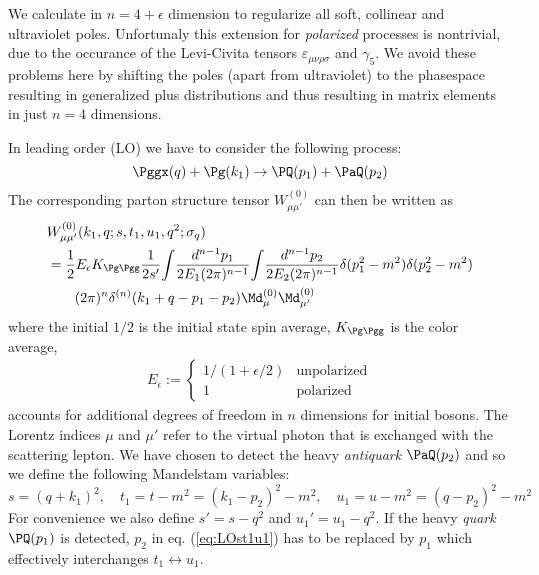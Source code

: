 We calculate in $n=4+\epsilon$ dimension to regularize all soft, collinear and ultraviolet poles. Unfortunaly this extension for \textit{polarized} processes is nontrivial, due to the occurance of the Levi-Civita tensors $\varepsilon_{\mu\nu\rho\sigma}$ and $\gamma_5$. We avoid these problems here by shifting the poles (apart from ultraviolet) to the phasespace resulting in generalized plus distributions and thus resulting in matrix elements in just $n=4$ dimensions.

In leading order (LO) we have to consider the following process:
\begin{equation}
\Pggx(q) + \Pg(k_1) \rightarrow \PQ(p_1)+\PaQ(p_2)
\end{equation}
The corresponding parton structure tensor $W_{\mu\mu'}^{(0)}$ can then be written as
\begin{align}
&W_{\mu\mu'}^{(0)}(k_1,q;s,t_1,u_1,q^2;\sigma_{q})\nonumber\\
 &= \frac 1 2 E_\epsilon K_{\Pg\Pgg}\frac{1}{2s'}\!\int\!\frac{d^{n-1}p_1}{2E_1(2\pi)^{n-1}}\!\int\!\frac{d^{n-1}p_2}{2E_2(2\pi)^{n-1}}\delta(p_1^2-m^2) \delta(p_2^2-m^2)\nonumber\\
 &\hspace{20pt}(2\pi)^n\delta^{(n)}(k_1+q-p_1-p_2) \Md_{\mu}^{(0)}\Md_{\mu'}^{(0)}
\label{eq:PartonicStructureTensor0}\end{align}
where the initial $1/2$ is the initial state spin average, $K_{\Pg\Pgg}$ is the color average,
\begin{align}
E_\epsilon := \left\{\begin{array}{ll}
1/(1+\epsilon/2) &\text{unpolarized}\\
1 &\text{polarized}
\end{array}\right.
\end{align}
accounts for additional degrees of freedom in $n$ dimensions for initial bosons. The Lorentz indices $\mu$ and $\mu'$ refer to the virtual photon that is exchanged with the scattering lepton. We have chosen to detect the heavy \textit{antiquark} $\PaQ(p_2)$ and so we define the following Mandelstam variables:
\begin{equation}
s = (q+k_1)^2, \quad t_1=t-m^2=(k_1-p_2)^2-m^2, \quad u_1 = u - m^2 = (q-p_2)^2 -m^2 \label{eq:LOst1u1}
\end{equation}
For convenience we also define $s' = s-q^2$ and $u_1' = u_1 - q^2$. If the heavy \textit{quark} $\PQ(p_1)$ is detected, $p_2$ in eq. (\ref{eq:LOst1u1}) has to be replaced by $p_1$ which effectively interchanges $t_1\leftrightarrow u_1$.

